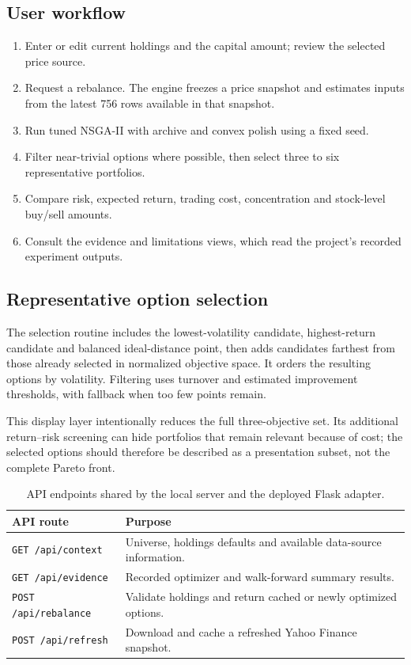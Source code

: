 \documentclass[12pt,a4paper]{article}
\begin{document}
\subsection{User workflow}
\begin{enumerate}
\item Enter or edit current holdings and the capital amount; review the selected price source.
\item Request a rebalance. The engine freezes a price snapshot and estimates inputs from the latest 756 rows available in that snapshot.
\item Run tuned NSGA-II with archive and convex polish using a fixed seed.
\item Filter near-trivial options where possible, then select three to six representative portfolios.
\item Compare risk, expected return, trading cost, concentration and stock-level buy/sell amounts.
\item Consult the evidence and limitations views, which read the project's recorded experiment outputs.
\end{enumerate}
\subsection{Representative option selection}
The selection routine includes the lowest-volatility candidate, highest-return candidate and balanced ideal-distance point, then adds candidates farthest from those already selected in normalized objective space. It orders the resulting options by volatility. Filtering uses turnover and estimated improvement thresholds, with fallback when too few points remain.

This display layer intentionally reduces the full three-objective set. Its additional return--risk screening can hide portfolios that remain relevant because of cost; the selected options should therefore be described as a presentation subset, not the complete Pareto front.
\begin{table}[H]\centering\small
\begin{tabularx}{\linewidth}{@{}p{50mm}Y@{}}\toprule
API route & Purpose\\\midrule
\texttt{GET /api/context} & Universe, holdings defaults and available data-source information.\\
\texttt{GET /api/evidence} & Recorded optimizer and walk-forward summary results.\\
\texttt{POST /api/rebalance} & Validate holdings and return cached or newly optimized options.\\
\texttt{POST /api/refresh} & Download and cache a refreshed Yahoo Finance snapshot.\\\bottomrule
\end{tabularx}
\caption{API endpoints shared by the local server and the deployed Flask adapter.}
\end{table}
\end{document}
